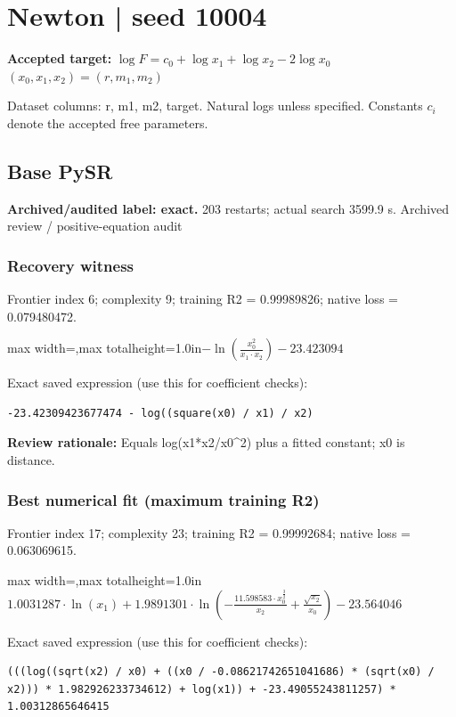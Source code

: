 \documentclass[10pt,letterpaper,landscape]{article}
\begin{document}
\section*{Newton | seed 10004}
\textbf{Accepted target:} $\displaystyle \log F=c_0+\log x_1+\log x_2-2\log x_0$\hfill $(x_0,x_1,x_2)=(r,m_1,m_2)$\par
{\small Dataset columns: r, m1, m2, target. Natural logs unless specified. Constants $c_i$ denote the accepted free parameters.}\par\medskip
\begin{minipage}[t]{0.485\textwidth}
\subsection*{Base PySR}
\textbf{Archived/audited label: exact.} 203 restarts; actual search 3599.9 s.
{\small Archived review / positive-equation audit}
\subsubsection*{Recovery witness}
Frontier index 6; complexity 9; training R2 = 0.99989826; native loss = 0.079480472.
\begin{center}\begin{adjustbox}{max width=\linewidth,max totalheight=1.0in}$\displaystyle - \ln{\left(\frac{x_{0}^{2}}{x_{1} \cdot x_{2}} \right)} - 23.423094$\end{adjustbox}\end{center}
{\scriptsize Exact saved expression (use this for coefficient checks):}
\begin{lstlisting}
-23.42309423677474 - log((square(x0) / x1) / x2)
\end{lstlisting}
{\small\textbf{Review rationale:} Equals log(x1*x2/x0\textasciicircum{}2) plus a fitted constant; x0 is distance.}
\subsubsection*{Best numerical fit (maximum training R2)}
Frontier index 17; complexity 23; training R2 = 0.99992684; native loss = 0.063069615.
\begin{center}\begin{adjustbox}{max width=\linewidth,max totalheight=1.0in}$\displaystyle 1.0031287 \cdot \ln{\left(x_{1} \right)} + 1.9891301 \cdot \ln{\left(- \frac{11.598583 \cdot x_{0}^{\frac{3}{2}}}{x_{2}} + \frac{\sqrt{x_{2}}}{x_{0}} \right)} - 23.564046$\end{adjustbox}\end{center}
{\scriptsize Exact saved expression (use this for coefficient checks):}
\begin{lstlisting}
(((log((sqrt(x2) / x0) + ((x0 / -0.08621742651041686) * (sqrt(x0) / x2))) * 1.982926233734612) + log(x1)) + -23.49055243811257) * 1.00312865646415
\end{lstlisting}
\end{minipage}\hfill
\end{document}
